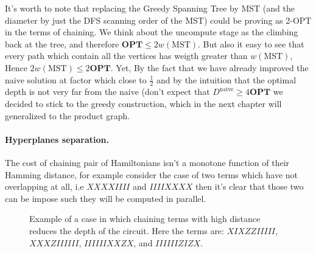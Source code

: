\documentclass{article}
\begin{document}
\begin{multicols}{2}
It's worth to note that replacing the Greedy Spanning Tree by MST (and the diameter by just the DFS scanning order of the MST) could be proving as 2-OPT in the terms of chaining. We think about the uncompute stage as the climbing back at the tree, and therefore \( \textbf{OPT} \le 2w\left(\text{MST} \right) \). But also it easy to see that every path which contain all the vertices has weigth greater than \(w\left(\text{MST} \right) \), Hence  \(2w\left(\text{MST} \right) \le 2\textbf{OPT}\).          
Yet, By the fact that we have already improved the naive solution at factor which close to \(\frac{1}{2}\) and by the intuition that the optimal depth is not very far from the naive (don't expect that \( D^{\text{naive}} \ge 4 \textbf{OPT} \) we decided to stick to the greedy construction, which in the next chapter will generalized to the product graph. 

\paragraph{Hyperplanes separation.} The cost of chaining pair of Hamiltonians isn't  a monotone function of their Hamming distance, for example consider the case of two terms which have not overlapping at all, i.e \( XXXXIIII \) and \(IIIIXXXX \) then it's clear that those two can be impose such they will be computed in parallel.   

\end{multicols}

\begin{figure*}[hb]
  
    \caption{ Example of a case in which chaining terms with high distance reduces the depth of the circuit. Here the terms are: \(XIXZZIIIII\), \(XXXZIIIIII\), \(IIIIIIXXZX\), and \(IIIIIIZIZX\). }
    \label{fig:average-data-vs-model}
\end{figure*}
\end{document}

